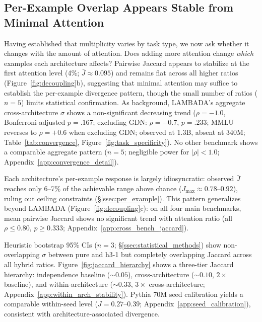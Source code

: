 \subsection{Per-Example Overlap Appears Stable from Minimal Attention}\label{ssec:decoupling}

Having established that multiplicity varies by task type, we now ask whether it changes with the amount of attention. Does adding more attention change \emph{which} examples each architecture affects? Pairwise Jaccard appears to stabilize at the first attention level (4\%; $\bar{J} \approx 0.095$) and remains flat across all higher ratios (Figure~\ref{fig:decoupling}b), suggesting that minimal attention may suffice to establish the per-example divergence pattern, though the small number of ratios ($n = 5$) limits statistical confirmation. As background, LAMBADA's aggregate cross-architecture $\sigma$ shows a non-significant decreasing trend ($\rho = -1.0$, Bonferroni-adjusted $p = .167$; excluding GDN: $\rho = -0.7$, $p = .233$; MMLU reverses to $\rho = +0.6$ when excluding GDN; observed at 1.3B, absent at 340M; Table~\ref{tab:convergence}, Figure~\ref{fig:task_specificity}). No other benchmark shows a comparable aggregate pattern ($n = 5$; negligible power for $|\rho| < 1.0$; Appendix~\ref{app:convergence_detail}).


Each architecture's per-example response is largely idiosyncratic: observed $\bar{J}$ reaches only 6--7\% of the achievable range above chance ($J_{\max} \approx 0.78$--$0.92$), ruling out ceiling constraints (\S\ref{ssec:per_example}). This pattern generalizes beyond LAMBADA (Figure~\ref{fig:decoupling}c): on all four main benchmarks, mean pairwise Jaccard shows no significant trend with attention ratio (all $\rho \leq 0.80$, $p \geq 0.333$; Appendix~\ref{app:cross_bench_jaccard}).

Heuristic bootstrap 95\% CIs ($n = 3$; \S\ref{ssec:statistical_methods}) show non-overlapping $\sigma$ between pure and h3-1 but completely overlapping Jaccard across all hybrid ratios. Figure~\ref{fig:jaccard_hierarchy} shows a three-tier Jaccard hierarchy: independence baseline (${\sim}0.05$), cross-architecture (${\sim}0.10$, $2\times$ baseline), and within-architecture (${\sim}0.33$, $3\times$ cross-architecture; Appendix~\ref{app:within_arch_stability}). Pythia 70M \citep{biderman2023pythia} seed calibration yields a comparable within-seed level ($J = 0.27$--$0.39$; Appendix~\ref{app:seed_calibration}), consistent with architecture-associated divergence.

